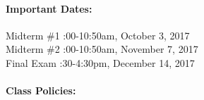 \documentclass[11pt, a4paper]{article}
\begin{document}
\paragraph{Important Dates:}
\begin{center} \begin{minipage}{3.8in}
\begin{flushleft}
Midterm \#1      :00-10:50am, October 3, 2017 \\
Midterm \#2      :00-10:50am, November 7, 2017\\
Final Exam       :30-4:30pm, December 14, 2017\\
\end{flushleft}
\end{minipage}
\end{center}

\paragraph{Class Policies:}
\end{document}
